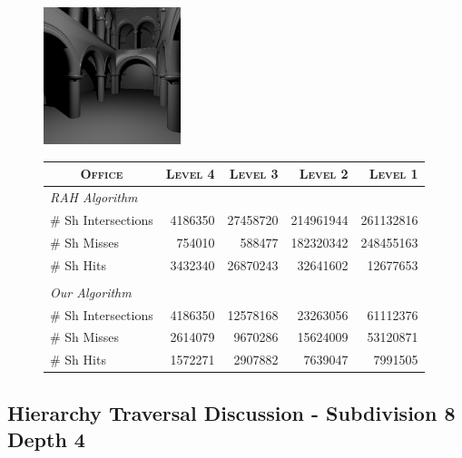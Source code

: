 \begin{figure}[!htb]
    \begin{minipage}{0.25\linewidth}
        \centering
        \includegraphics[width=4.0cm]{Images/Sponza_Preview}
    \end{minipage}
    \begin{minipage}{0.725\linewidth}
        \centering
        \fontsize{8}{10}
        \selectfont
        \begin{tabular}[h]{l|rrrr}
            \multicolumn{1}{c|}{\textsc{Office}} & \textsc{Level 4} & \textsc{Level 3} & \textsc{Level 2} & \textsc{Level 1}\\
            \hline
            \emph{RAH Algorithm} & & \\
            \hline
            \quad \# Sh Intersections   & 4186350	& 27458720  & 214961944	& 261132816	\\
            \quad \# Sh Misses          & 754010	& 588477	& 182320342	& 248455163	\\
            \quad \# Sh Hits            & 3432340	& 26870243	& 32641602	& 12677653	\\
            & & \\
            \hline
            \emph{Our Algorithm} & & \\
            \hline
            \quad \# Sh Intersections   & 4186350	& 12578168	& 23263056	& 61112376	\\
            \quad \# Sh Misses          & 2614079	& 9670286	& 15624009	& 53120871	\\
            \quad \# Sh Hits            & 1572271	& 2907882	& 7639047	& 7991505	\\
        \end{tabular}
        \label{table:sponza-d8-n4-results}
    \end{minipage}
\end{figure}

\subsection{Hierarchy Traversal Discussion - Subdivision 8 Depth 4}

